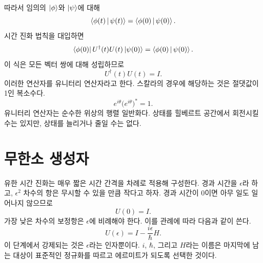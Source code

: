 따라서 임의의 \(\left\lvert\phi\right\rangle\)와 \(\left\lvert\psi\right\rangle\)에 대해
\begin{equation}
\left\langle\phi(t)\,\middle|\,\psi(t)\right\rangle
=
\left\langle\phi(0)\,\middle|\,\psi(0)\right\rangle.
\end{equation}
시간 진화 법칙을 대입하면
\begin{equation}
\left\langle\phi(0)\right\rvert U^\dagger(t)U(t)\left\lvert\psi(0)\right\rangle
=
\left\langle\phi(0)\,\middle|\,\psi(0)\right\rangle.
\end{equation}
이 식은 모든 벡터 쌍에 대해 성립하므로
\begin{equation}
\boxed{U^\dagger(t)U(t)=I}.
\end{equation}
이러한 연산자를 유니터리 연산자라고 한다. 스칼라의 경우에 해당하는 것은 절댓값이 1인 복소수다.
\begin{equation}
e^{i\theta}\bigl(e^{i\theta}\bigr)^*=1.
\end{equation}
유니터리 연산자는 순수한 위상의 행렬 일반화다. 상태를 힐베르트 공간에서 회전시킬 수는 있지만, 상태를 늘리거나 줄일 수는 없다.

\section{무한소 생성자}

유한 시간 진화는 매우 짧은 시간 간격을 차례로 적용해 구성한다. 경과 시간을 \(\epsilon\)라 하고, \(\epsilon^2\) 차수의 항은 무시할 수 있을 만큼 작다고 하자. 경과 시간이 0이면 아무 일도 일어나지 않으므로
\begin{equation}
U(0)=I.
\end{equation}
가장 낮은 차수의 보정항은 \(\epsilon\)에 비례해야 한다. 이를 관례에 따라 다음과 같이 쓴다.
\begin{equation}
\boxed{U(\epsilon)=I-\frac{i\epsilon}{\hbar}H}.
\end{equation}
이 단계에서 강제되는 것은 \(\epsilon\)라는 인자뿐이다. \(i\), \(\hbar\), 그리고 \(H\)라는 이름은 마지막에 남는 대상이 표준적인 정규화를 따르고 에르미트가 되도록 선택한 것이다.

\begin{classroomqa}
\end{classroomqa}

